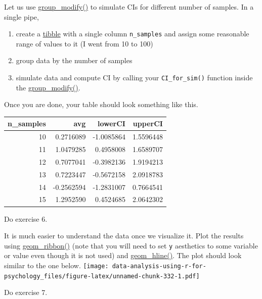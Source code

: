 \documentclass[
]{book}
\providecommand{\tightlist}{%
  \setlength{\itemsep}{0pt}\setlength{\parskip}{0pt}}
\begin{document}
Let us use \href{https://dplyr.tidyverse.org/reference/group_map.html}{group\_modify()} to simulate CIs for different number of samples. In a single pipe,

\begin{enumerate}
\def\labelenumi{\arabic{enumi}.}
\tightlist
\item
  create a \href{https://tibble.tidyverse.org/reference/tibble.html}{tibble} with a single column \texttt{n\_samples} and assign some reasonable range of values to it (I went from 10 to 100)
\item
  group data by the number of samples
\item
  simulate data and compute CI by calling your \texttt{CI\_for\_sim()} function inside the \href{https://dplyr.tidyverse.org/reference/group_map.html}{group\_modify()}.
\end{enumerate}

Once you are done, your table should look something like this.

\begin{tabular}{r|r|r|r}
\hline
n\_samples & avg & lowerCI & upperCI\\
\hline
10 & 0.2716089 & -1.0085864 & 1.5596448\\
\hline
11 & 1.0479285 & 0.4958008 & 1.6589707\\
\hline
12 & 0.7077041 & -0.3982136 & 1.9194213\\
\hline
13 & 0.7223447 & -0.5672158 & 2.0918783\\
\hline
14 & -0.2562594 & -1.2831007 & 0.7664541\\
\hline
15 & 1.2952590 & 0.4524685 & 2.0642302\\
\hline
\end{tabular}

Do exercise 6.

It is much easier to understand the data once we visualize it. Plot the results using \href{https://ggplot2.tidyverse.org/reference/geom_ribbon.html}{geom\_ribbon()} (note that you will need to set \texttt{y} aesthetics to some variable or value even though it is not used) and \href{https://ggplot2.tidyverse.org/reference/geom_abline.html}{geom\_hline()}. The plot should look similar to the one below.
\texttt{[image: data-analysis-using-r-for-psychology\_files/figure-latex/unnamed-chunk-332-1.pdf]}

Do exercise 7.
\end{document}
